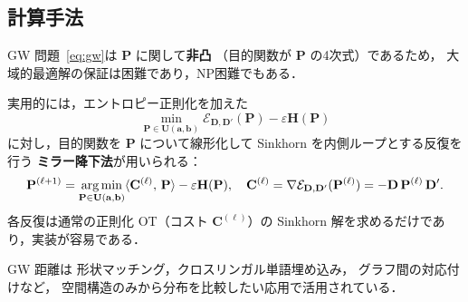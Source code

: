 \subsection{計算手法}\label{subsec:gw-computation}

GW 問題~\eqref{eq:gw}は $\mathbf{P}$ に関して\textbf{非凸}
（目的関数が $\mathbf{P}$ の4次式）であるため，
大域的最適解の保証は困難であり，NP困難でもある．

実用的には，エントロピー正則化を加えた
\begin{equation}\label{eq:gw-entropic}
  \min_{\mathbf{P} \in \mathbf{U}(\mathbf{a}, \mathbf{b})}
  \mathcal{E}_{\mathbf{D}, \mathbf{D}'}(\mathbf{P})
  - \varepsilon \mathbf{H}(\mathbf{P})
\end{equation}
に対し，目的関数を $\mathbf{P}$ について線形化して
Sinkhorn を内側ループとする反復を行う
\textbf{ミラー降下法}が用いられる：
\[
  \mathbf{P}^{(\ell+1)}
  = \operatorname*{arg\,min}_{\mathbf{P} \in \mathbf{U}(\mathbf{a}, \mathbf{b})}
  \langle \mathbf{C}^{(\ell)},\, \mathbf{P} \rangle - \varepsilon \mathbf{H}(\mathbf{P}),
  \quad
  \mathbf{C}^{(\ell)} = \nabla \mathcal{E}_{\mathbf{D}, \mathbf{D}'}(\mathbf{P}^{(\ell)})
  = -\mathbf{D}\, \mathbf{P}^{(\ell)}\, \mathbf{D}'.
\]
各反復は通常の正則化 OT（コスト $\mathbf{C}^{(\ell)}$）の
Sinkhorn 解を求めるだけであり，実装が容易である．

GW 距離は
形状マッチング，クロスリンガル単語埋め込み，
グラフ間の対応付けなど，
空間構造のみから分布を比較したい応用で活用されている．
